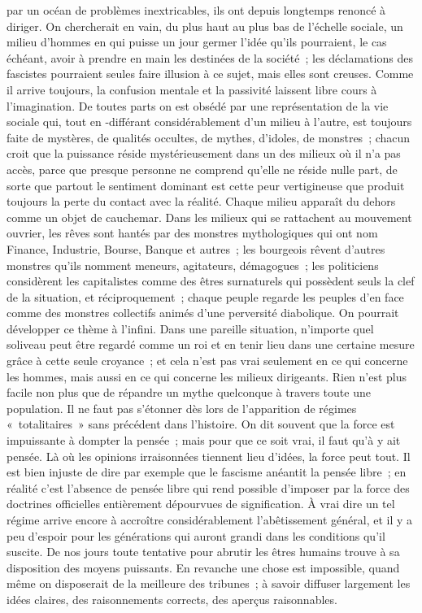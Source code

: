 \documentclass[french,twoside]{book} %
\begin{document}
par un océan de problèmes inextricables, ils ont depuis longtemps renoncé à diriger. On chercherait en vain, du plus haut au plus bas de l'échelle sociale, un milieu d'hommes en qui puisse un jour germer l'idée qu'ils pourraient, le cas échéant, avoir à prendre en main les destinées de la société ; les déclamations des fascistes pourraient seules faire illusion à ce sujet, mais elles sont creuses. Comme il arrive toujours, la confusion mentale et la passivité laissent libre cours à l'imagination. De toutes parts on est obsédé par une représentation de la vie sociale qui, tout en -différant considérablement d'un milieu à l'autre, est toujours faite de mystères, de qualités occultes, de mythes, d'idoles, de monstres ; chacun croit que la puissance réside mystérieusement dans un des milieux où il n'a pas accès, parce que presque personne ne comprend qu'elle ne réside nulle part, de sorte que partout le sentiment dominant est cette peur vertigineuse que produit toujours la perte du contact avec la réalité. Chaque milieu apparaît du dehors comme un objet de cauchemar. Dans les milieux qui se rattachent au mouvement ouvrier, les rêves sont hantés par des monstres mythologiques qui ont nom Finance, Industrie, Bourse, Banque et autres ; les bourgeois rêvent d'autres monstres qu'ils nomment meneurs, agitateurs, démagogues ; les politiciens considèrent les capitalistes comme des êtres surnaturels qui possèdent seuls la clef de la situation, et réciproquement ; chaque peuple regarde les peuples d'en face comme des monstres collectifs animés d'une perversité diabolique. On pourrait développer ce thème à l'infini. Dans une pareille situation, n'importe quel soliveau peut être regardé comme un roi et en tenir lieu dans une certaine mesure grâce à cette seule croyance ; et cela n'est pas vrai seulement en ce qui concerne les hommes, mais aussi en ce qui concerne les milieux dirigeants. Rien n'est plus facile non plus que de répandre un mythe quelconque à travers toute une population. Il ne faut pas s'étonner dès lors de l'apparition de régimes « totalitaires » sans précédent dans l'histoire. On dit souvent que la force est impuissante à dompter la pensée ; mais pour que ce soit vrai, il faut qu'à y ait pensée. Là où les opinions irraisonnées tiennent lieu d'idées, la force peut tout. Il est bien injuste de dire par exemple que le fascisme anéantit la pensée libre ; en réalité c'est l'absence de pensée libre qui rend possible d'imposer par la force des doctrines officielles entièrement dépourvues de signification. À vrai dire un tel régime arrive encore à accroître considérablement l'abêtissement général, et il y a peu d'espoir pour les générations qui auront grandi dans les conditions qu'il suscite. De nos jours toute tentative pour abrutir les êtres humains trouve à sa disposition des moyens puissants. En revanche une chose est impossible, quand même on disposerait de la meilleure des tribunes ; à savoir diffuser largement les idées claires, des raisonnements corrects, des aperçus raisonnables.\par
\end{document}
